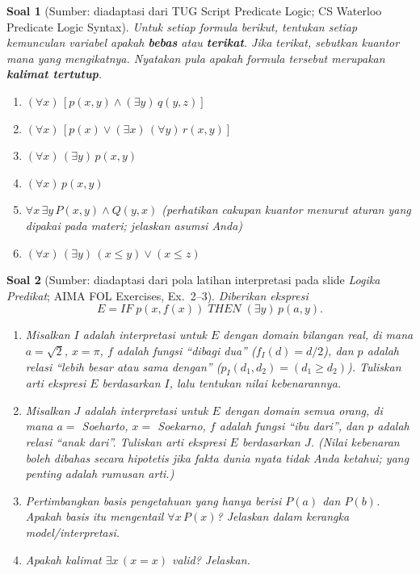 \documentclass[12pt,a4paper]{article}
\theoremstyle{soaljarak}
\newtheorem{soal}{Soal}
\begin{document}
\begin{soal}[\normalfont Sumber: diadaptasi dari TUG Script Predicate Logic; CS Waterloo Predicate Logic Syntax]
  Untuk setiap formula berikut, tentukan setiap kemunculan variabel apakah \textbf{bebas} atau \textbf{terikat}.
  Jika terikat, sebutkan kuantor mana yang mengikatnya.
  Nyatakan pula apakah formula tersebut merupakan \textbf{kalimat tertutup}.
  \begin{enumerate}
    \item \((\forall x)\,[p(x,y) \wedge (\exists y)\,q(y,z)]\)
    \item \((\forall x)\,[p(x) \vee (\exists x)\,(\forall y)\,r(x,y)]\)
    \item \((\forall x)\,(\exists y)\,p(x,y)\)
    \item \((\forall x)\,p(x,y)\)
    \item \(\forall x\,\exists y\,P(x,y) \wedge Q(y,x)\)
      (perhatikan cakupan kuantor menurut aturan yang dipakai pada materi; jelaskan asumsi Anda)
    \item \((\forall x)\,(\exists y)\,(x \leq y) \vee (x \leq z)\)
  \end{enumerate}
\end{soal}

\begin{soal}[\normalfont Sumber: diadaptasi dari pola latihan interpretasi pada slide \textit{Logika Predikat}; AIMA FOL Exercises, Ex.~2--3]
  Diberikan ekspresi
  \[
  E = \mathit{IF}\; p(x,f(x))\; \mathit{THEN}\; (\exists y)\,p(a,y).
  \]
  \begin{enumerate}
    \item Misalkan \(I\) adalah interpretasi untuk \(E\) dengan domain bilangan real, di mana
          \(a = \sqrt{2}\), \(x = \pi\),
          \(f\) adalah fungsi ``dibagi dua'' (\(f_I(d) = d/2\)),
          dan \(p\) adalah relasi ``lebih besar atau sama dengan'' (\(p_I(d_1,d_2) = (d_1 \geq d_2)\)).
          Tuliskan arti ekspresi \(E\) berdasarkan \(I\), lalu tentukan nilai kebenarannya.
    \item Misalkan \(J\) adalah interpretasi untuk \(E\) dengan domain semua orang, di mana
          \(a =\) Soeharto, \(x =\) Soekarno,
          \(f\) adalah fungsi ``ibu dari'',
          dan \(p\) adalah relasi ``anak dari''.
          Tuliskan arti ekspresi \(E\) berdasarkan \(J\).
          (Nilai kebenaran boleh dibahas secara hipotetis jika fakta dunia nyata tidak Anda ketahui; yang penting adalah rumusan arti.)
    \item Pertimbangkan basis pengetahuan yang hanya berisi \(P(a)\) dan \(P(b)\).
          Apakah basis itu mengentail \(\forall x\,P(x)\)?
          Jelaskan dalam kerangka model/interpretasi.
    \item Apakah kalimat \(\exists x\,(x=x)\) valid?
          Jelaskan.
  \end{enumerate}
\end{soal}
\end{document}
